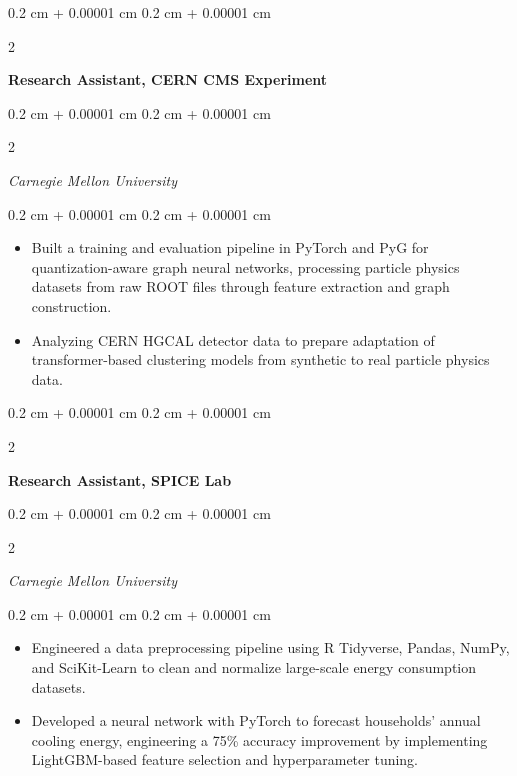 \documentclass[10pt, letterpaper]{article}
\newenvironment{highlights}{
    \begin{itemize}[
        topsep=0.10 cm,
        parsep=0.10 cm,
        partopsep=0pt,
        itemsep=0pt,
        leftmargin=0.4 cm + 10pt
    ]
}{
    \end{itemize}
} %
\newenvironment{onecolentry}{
    \begin{adjustwidth}{
        0.2 cm + 0.00001 cm
    }{
        0.2 cm + 0.00001 cm
    }
}{
    \end{adjustwidth}
} %
\newenvironment{twocolentry}[2][]{
    \onecolentry
    \def\secondColumn{#2}
    \setcolumnwidth{\fill, 4.5 cm}
    \begin{paracol}{2}
}{
    \switchcolumn \raggedleft \secondColumn
    \end{paracol}
    \endonecolentry
} %
\begin{document}
        \begin{twocolentry}{
            \text{September 2025 - Present}}
            \textbf{Research Assistant, CERN CMS Experiment}
        \end{twocolentry}
        \begin{twocolentry}{
            }
            \textit{Carnegie Mellon University}
        \end{twocolentry}
        \vspace{0.10 cm}
        \begin{onecolentry}
            \begin{highlights}
                \item Built a training and evaluation pipeline in PyTorch and PyG for quantization-aware graph neural networks, processing particle physics datasets from raw ROOT files through feature extraction and graph construction.
                \item Analyzing CERN HGCAL detector data to prepare adaptation of transformer-based clustering models from synthetic to real particle physics data.
            \end{highlights}
        \end{onecolentry}
        \begin{twocolentry}{
        }
            \textbf{Research Assistant, SPICE Lab}
        \end{twocolentry} 
        \begin{twocolentry}{
            }
        \textit{Carnegie Mellon University}
        \end{twocolentry}

        \vspace{0.10 cm}
        \begin{onecolentry}
            \begin{highlights}
                \item Engineered a data preprocessing pipeline using R Tidyverse, Pandas, NumPy, and SciKit-Learn to clean and normalize large-scale energy consumption datasets.
                \item Developed a neural network with PyTorch to forecast households' annual cooling energy, engineering a 75\% accuracy improvement by implementing LightGBM-based feature selection and hyperparameter tuning.
            \end{highlights}
        \end{onecolentry}
\end{document}
